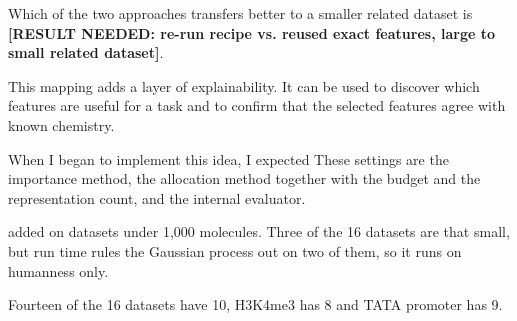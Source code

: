 Which of the two approaches transfers better to a smaller related dataset is \textbf{[RESULT NEEDED: re-run recipe vs. reused exact features, large to small related dataset]}.

This mapping adds a layer of explainability. It can be used to discover which features are useful for a task and to confirm that the selected features agree with known chemistry.

When I began to implement this idea, I expected
These settings are the importance method, the allocation method together with the budget and the representation count, and the internal evaluator.

added on datasets under 1,000 molecules. Three of the 16 datasets are that small, but run time rules the Gaussian process out on two of them, so it runs on humanness only.

Fourteen of the 16 datasets have 10, H3K4me3 has 8 and TATA promoter has 9.

